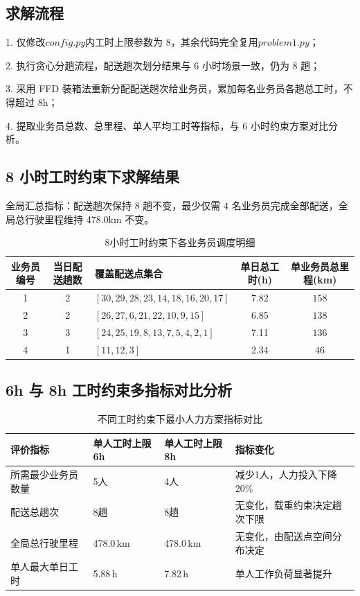 \documentclass[withoutpreface,bwprint]{cumcmthesis} %
\begin{document}
\subsection{求解流程}
1.	仅修改\(config.py\)内工时上限参数为 8，其余代码完全复用\(problem1.py\)；
\par 2.	执行贪心分趟流程，配送趟次划分结果与 6 小时场景一致，仍为 8 趟；
\par 3.	采用 FFD 装箱法重新分配配送趟次给业务员，累加每名业务员各趟总工时，不得超过 8h；
\par 4.	提取业务员总数、总里程、单人平均工时等指标，与 6 小时约束方案对比分析。

\subsection{8 小时工时约束下求解结果}
全局汇总指标：配送趟次保持 8 趟不变，最少仅需 4 名业务员完成全部配送，全局总行驶里程维持 478.0km 不变。

\begin{table}[htbp]
\centering
\setlength{\tabcolsep}{4pt}
\footnotesize
\caption{8小时工时约束下各业务员调度明细}
\begin{tabularx}{\textwidth}{c c >{\RaggedRight\arraybackslash}X c c}
\toprule
业务员编号 & 当日配送趟数 & 覆盖配送点集合 & 单日总工时(h) & 单业务员总里程(km) \\
\midrule
1 & 2 & $[30,29,28,23,14,18,16,20,17]$ & 7.82 & $158$ \\
2 & 2 & $[26,27,6,21,22,10,9,15]$ & 6.85 & $138$ \\
3 & 3 & $[24,25,19,8,13,7,5,4,2,1]$ & 7.11 & $136$ \\
4 & 1 & $[11,12,3]$ & 2.34 & $46$ \\
\bottomrule
\end{tabularx}
\label{tab:schedule_8h}
\end{table}

\subsection{6h 与 8h 工时约束多指标对比分析}
\begin{table}[htbp]
\centering
\setlength{\tabcolsep}{4pt}
\footnotesize
\caption{不同工时约束下最小人力方案指标对比}
\begin{tabularx}{\textwidth}{l l l >{\RaggedRight\arraybackslash}X}
\toprule
评价指标 & 单人工时上限6h & 单人工时上限8h & 指标变化 \\
\midrule
所需最少业务员数量 & 5人 & 4人 & 减少1人，人力投入下降20\% \\
配送总趟次 & 8趟 & 8趟 & 无变化，载重约束决定趟次下限 \\
全局总行驶里程 & 478.0\,km & 478.0\,km & 无变化，由配送点空间分布决定 \\
单人最大单日工时 & 5.88\,h & 7.82\,h & 单人工作负荷显著提升 \\
\bottomrule
\end{tabularx}
\label{tab:compare_6h_8h}
\end{table}
\end{document}
